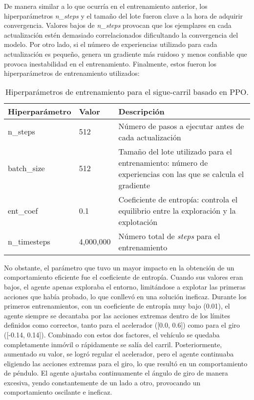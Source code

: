 De manera similar a lo que ocurría en el entrenamiento anterior, los hiperparámetros \textit{n\_steps} y el tamaño del lote fueron clave a la hora de adquirir convergencia. Valores bajos de \textit{n\_steps} provocan que los ejemplares en cada actualización estén demasiado correlacionados dificultando la convergencia del modelo. Por otro lado, si el número de experiencias utilizado para cada actualización es pequeño, genera un gradiente más ruidoso y menos confiable que provoca inestabilidad en el entrenamiento. Finalmente, estos fueron los hiperparámetros de entrenamiento utilizados:
\begin{table}[ht]
\centering
\begin{tabular}{|l|l|p{9cm}|}
\hline
\textbf{Hiperparámetro} & \textbf{Valor} & \textbf{Descripción} \\ \hline
n\_steps & 512 & Número de pasos a ejecutar antes de cada actualización \\ \hline
batch\_size & 512 & Tamaño del lote utilizado para el entrenamiento: número de experiencias con las que se calcula el gradiente \\ \hline
ent\_coef & 0.1 & Coeficiente de entropía: controla el equilibrio entre la exploración y la explotación \\ \hline
n\_timesteps & 4,000,000 & Número total de \textit{steps} para el entrenamiento \\ \hline
\end{tabular}
\caption{Hiperparámetros de entrenamiento para el sigue-carril basado en \ac{PPO}.}
\label{tab:hiper_params_ppo}
\end{table}

\newpage

No obstante, el parámetro que tuvo un mayor impacto en la obtención de un comportamiento eficiente fue el coeficiente de entropía. Cuando sus valores eran bajos, el agente apenas exploraba el entorno, limitándose a explotar las primeras acciones que había probado, lo que conllevó en una solución ineficaz. Durante los primeros entrenamientos, con un coeficiente de entropía muy bajo (0.01), el agente siempre se decantaba por las acciones extremas dentro de los límites definidos como correctos, tanto para el acelerador ([0.0, 0.6]) como para el giro ([-0.14, 0.14]). Combinado con estos dos factores, el vehículo se quedaba completamente inmóvil o rápidamente se salía del carril. Posteriormente, aumentado su valor, se logró regular el acelerador, pero el agente continuaba eligiendo las acciones extremas para el giro, lo que resultó en un comportamiento de péndulo. El agente ajustaba continuamente el ángulo de giro de manera excesiva, yendo constantemente de un lado a otro, provocando un comportamiento oscilante e ineficaz.

